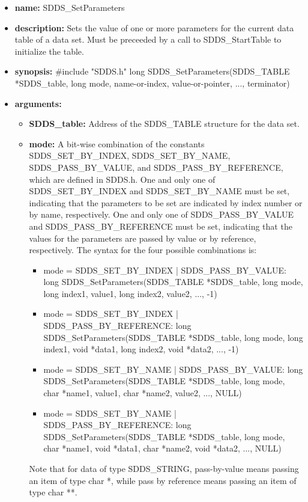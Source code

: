 \documentclass[11pt]{article}
\begin{document}
\begin{itemize}
\item {\bf name:}\newline
SDDS\_SetParameters
\item {\bf description:}\newline
Sets the value of one or more parameters for the current data table of a data set. Must be preceeded by a call to SDDS\_StartTable to initialize the table.
\item {\bf synopsis:} \#include "SDDS.h"\newline
long SDDS\_SetParameters(SDDS\_TABLE *SDDS\_table, long mode,  name-or-index,  value-or-pointer, ...,  terminator)
\item {\bf arguments:}
\begin{itemize}
\item {\bf SDDS\_table:} Address of the SDDS\_TABLE structure for the data set.
\item {\bf mode:} A bit-wise combination of the constants SDDS\_SET\_BY\_INDEX, SDDS\_SET\_BY\_NAME, SDDS\_PASS\_BY\_VALUE, and SDDS\_PASS\_BY\_REFERENCE, which are defined in  SDDS.h. One and only one of SDDS\_SET\_BY\_INDEX and SDDS\_SET\_BY\_NAME must be set, indicating that the parameters to be set are indicated by index number or by name, respectively. One and only one of SDDS\_PASS\_BY\_VALUE and SDDS\_PASS\_BY\_REFERENCE must be set, indicating that the values for the parameters are passed by value or by reference, respectively. The syntax for the four possible combinations is:
\begin{itemize}
\item mode = SDDS\_SET\_BY\_INDEX | SDDS\_PASS\_BY\_VALUE: long SDDS\_SetParameters(SDDS\_TABLE *SDDS\_table, long mode, long index1,  value1, long index2,  value2, ..., -1)
\item mode = SDDS\_SET\_BY\_INDEX | SDDS\_PASS\_BY\_REFERENCE: long SDDS\_SetParameters(SDDS\_TABLE *SDDS\_table, long mode, long index1, void *data1, long index2, void *data2, ..., -1)
\item mode = SDDS\_SET\_BY\_NAME | SDDS\_PASS\_BY\_VALUE: long SDDS\_SetParameters(SDDS\_TABLE *SDDS\_table, long mode, char *name1,  value1, char *name2,  value2, ..., NULL)
\item mode = SDDS\_SET\_BY\_NAME | SDDS\_PASS\_BY\_REFERENCE: long SDDS\_SetParameters(SDDS\_TABLE *SDDS\_table, long mode, char *name1, void *data1, char *name2, void *data2, ..., NULL)  
\end{itemize}
Note that for data of type SDDS\_STRING, pass-by-value means passing an item of type char *, while pass by reference means passing an item of type char **.

\end{itemize}
\end{itemize}
\end{document}
